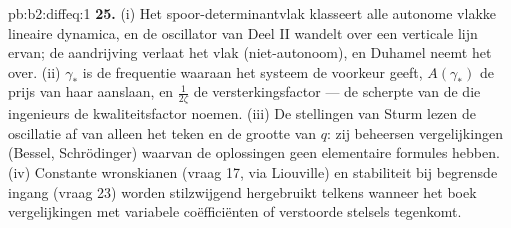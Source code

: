 \begin{solution}{pb:b2:diffeq:1}
\textbf{25.} (i) Het spoor-determinantvlak klasseert alle autonome
vlakke lineaire dynamica, en de oscillator van Deel II wandelt over
een verticale lijn ervan; de aandrijving verlaat het vlak
(niet-autonoom), en Duhamel neemt het over. (ii) $\gamma_*$ is de
frequentie waaraan het systeem de voorkeur geeft, $A(\gamma_*)$ de
prijs van haar aanslaan, en $\frac{1}{2\zeta}$ de
versterkingsfactor --- de scherpte van de  die ingenieurs
de kwaliteitsfactor noemen. (iii) De stellingen van Sturm lezen de
oscillatie af van alleen het teken en de grootte van $q$: zij
beheersen vergelijkingen (Bessel, Schrödinger) waarvan de
oplossingen geen elementaire formules hebben. (iv) Constante
wronskianen (vraag 17, via Liouville) en stabiliteit bij begrensde
ingang (vraag 23) worden stilzwijgend hergebruikt telkens wanneer
het boek vergelijkingen met variabele coëfficiënten of verstoorde
stelsels tegenkomt.
\end{solution}
